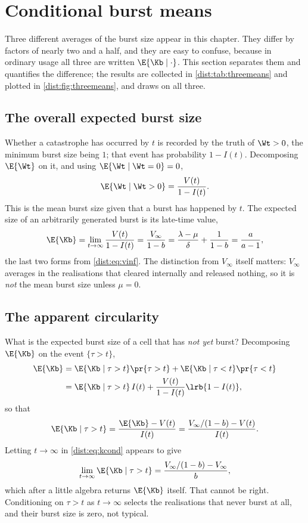 \section{Conditional burst means}
\label{dist:sec:cond-means}

Three different averages of the burst size appear in this chapter. They differ
by factors of nearly two and a half, and they are easy to confuse, because in
ordinary usage all three are written $\E{\Kb\mid\cdot}$. This section
separates them and quantifies the difference; the results are collected in
\cref{dist:tab:threemeans} and plotted in \cref{dist:fig:threemeans}, and
\ChPop{} draws on all three.

\subsection{The overall expected burst size}
\label{dist:sec:overall-mean}

Whether a catastrophe has occurred by $t$ is recorded by the truth of
$\Wt>0$, the minimum burst size being $1$; that event has probability
$1-I(t)$. Decomposing $\E{\Wt}$ on it, and using
$\E{\Wt\mid\Wt=0}=0$,
\begin{equation}
\E{\Wt\mid\Wt > 0} = \frac{V(t)}{1-I(t)}.
\label{dist:eq:voveri}
\end{equation}
This is the mean burst size given that a burst has happened by $t$. The
expected size of an arbitrarily generated burst is its late-time value,
\begin{equation}
\E{\Kb}=\lim_{t\to\infty}\frac{V(t)}{1-I(t)}
=\frac{V_\infty}{1-b}
=\frac{\lambda-\mu}{\delta}+\frac{1}{1-b}
=\frac{a}{a-1},
\label{dist:eq:meank}
\end{equation}
the last two forms from \cref{dist:eq:vinf}. The distinction from $V_\infty$
itself matters: $V_\infty$ averages in the realisations that cleared
internally and released nothing, so it is \emph{not} the mean burst size
unless $\mu=0$.

\subsection{The apparent circularity}
\label{dist:sec:circularity}

What is the expected burst size of a cell that has \emph{not yet} burst?
Decomposing $\E{\Kb}$ on the event $\{\tau>t\}$,
\begin{align}
\E{\Kb} &= \E{\Kb\mid \tau > t}\pr{\tau > t}
+ \E{\Kb\mid \tau < t}\pr{\tau<t}\nonumber\\
&= \E{\Kb\mid\tau > t}\, I(t) + \frac{V(t)}{1 - I(t)}\lrb{1 - I(t)},
\label{dist:eq:kdecomp}
\end{align}
so that
\begin{equation}
\E{\Kb\mid \tau > t} = \frac{\E{\Kb} - V(t)}{I(t)}
=\frac{V_\infty/(1-b) - V(t)}{I(t)}.
\label{dist:eq:kcond}
\end{equation}
Letting $t\to\infty$ in \cref{dist:eq:kcond} appears to give
\[
\lim_{t\to\infty}\E{\Kb\mid \tau > t}
=\frac{V_\infty/(1-b)-V_\infty}{b},
\]
which after a little algebra returns $\E{\Kb}$ itself. That cannot be right.
Conditioning on $\tau>t$ as $t\to\infty$ selects the realisations that never
burst at all, and their burst size is zero, not typical.

